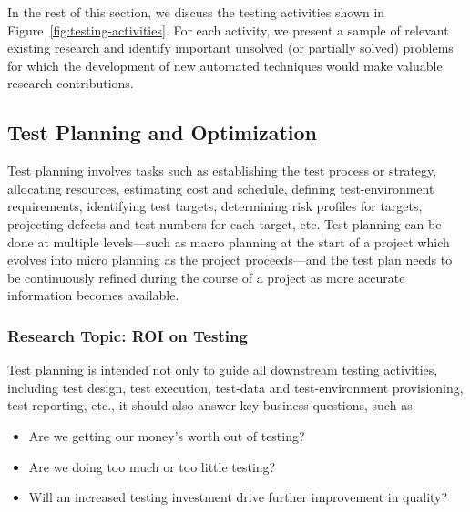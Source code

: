 In the rest of this section, we discuss the testing activities shown in
Figure~\ref{fig:testing-activities}. For each activity, we present a sample of
relevant existing research and identify important unsolved (or partially solved)
problems for which the development of new automated techniques would make
valuable research contributions.

\subsection{Test Planning and Optimization}
\label{sec:test-planning}

Test planning involves tasks such as establishing the test process or strategy,
allocating resources, estimating cost and schedule, defining test-environment
requirements, identifying test targets, determining risk profiles for targets,
projecting defects and test numbers for each target, etc.  Test planning can be
done at multiple levels---such as macro planning at the start of a project which
evolves into micro planning as the project proceeds---and the test plan needs to
be continuously refined during the course of a project as more accurate
information becomes available.

\subsubsection*{Research Topic: ROI on Testing}

Test planning is intended not only to guide all downstream testing activities,
including test design, test execution, test-data and test-environment
provisioning, test reporting, etc., it should also answer key business
questions, such as~\cite{Kagan:NextGenTesting}

\vspace*{-7pt}
\begin{itemize}
\denseitems


\item Are we getting our money's worth out of testing?

\item Are we doing too much or too little testing?

\item Will an increased testing investment drive further improvement in quality?


\end{itemize}
\vspace*{-5pt}

